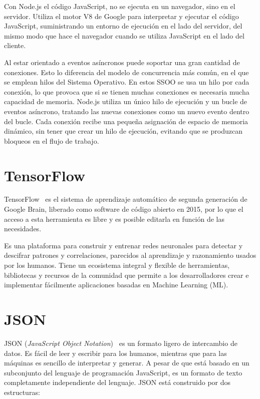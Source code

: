 \documentclass[a4paper, 12pt]{book}
\begin{document}
Con Node.js el código JavaScript, no se ejecuta en un navegador, sino en el servidor. Utiliza el motor V8 de Google para interpretar y ejecutar el código JavaScript, suministrando un entorno de ejecución en el lado del servidor, del mismo modo que hace el navegador cuando se utiliza JavaScript en el lado del cliente.

Al estar orientado a eventos asíncronos puede soportar una gran cantidad de conexiones. 
Esto lo diferencia del modelo de concurrencia más común, en el que se emplean hilos del Sistema Operativo. En estos SSOO se usa un hilo por cada conexión, lo que provoca que si se tienen muchas conexiones es necesaria mucha capacidad de memoria. 
Node.js utiliza un único hilo de ejecución y un bucle de eventos asíncrono, tratando las nuevas conexiones como un nuevo evento dentro del bucle. Cada conexión recibe una pequeña asignación de espacio de memoria dinámico, sin tener que crear un hilo de ejecución, evitando que se produzcan bloqueos en el flujo de trabajo. 

\section{TensorFlow} 
\label{sec:TensorFlow}

TensorFlow~\cite{Pagina_de_TensorFlow} es el sistema de aprendizaje automático de segunda generación de Google Brain, liberado como software de código abierto en 2015, por lo que el acceso a esta herramienta es libre y es posible editarla en función de las necesidades. 

Es una plataforma para construir y entrenar redes neuronales para detectar y descifrar patrones y correlaciones, parecidos al aprendizaje y razonamiento usados por los humanos. 
Tiene un ecosistema integral y flexible de herramientas, bibliotecas y recursos de la comunidad que permite a los desarrolladores crear e implementar fácilmente aplicaciones basadas en Machine Learning (ML).


\section{JSON} 
\label{sec:JSON}

JSON (\emph{JavaScript Object Notation})~\cite{Pagina_de_JSON} es un formato ligero de intercambio de datos. Es fácil de leer y escribir para los humanos, mientras que para las máquinas es sencillo de interpretar y generar. 
A pesar de que está basado en un subconjunto del lenguaje de programación JavaScript, es un formato de texto completamente independiente del lenguaje. JSON está construido por dos estructuras:
\end{document}
